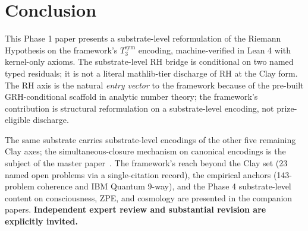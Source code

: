 \documentclass[11pt,a4paper]{article}
\theoremstyle{plain}
\theoremstyle{definition}
\begin{document}
\section{Conclusion}
\label{sec:conclusion}

This Phase 1 paper presents a substrate-level reformulation of the
Riemann Hypothesis on the framework's $T_{3}^{\mathrm{sym}}$
encoding, machine-verified in Lean 4 with kernel-only axioms. The
substrate-level RH bridge is conditional on two named typed
residuals; it is not a literal mathlib-tier discharge of RH at the
Clay form. The RH axis is the natural \emph{entry vector} to the
framework because of the pre-built GRH-conditional scaffold in
analytic number theory; the framework's contribution is structural
reformulation on a substrate-level encoding, not prize-eligible
discharge.

The same substrate carries substrate-level encodings of the other
five remaining Clay axes; the simultaneous-closure mechanism on
canonical encodings is the subject of the master
paper~\cite{master_substrate}. The framework's reach beyond the Clay
set (23 named open problems via a single-citation record), the
empirical anchors (143-problem coherence and IBM Quantum 9-way), and
the Phase 4 substrate-level content on consciousness, ZPE, and
cosmology are presented in the companion papers. \textbf{Independent
expert review and substantial revision are explicitly invited.}
\end{document}
